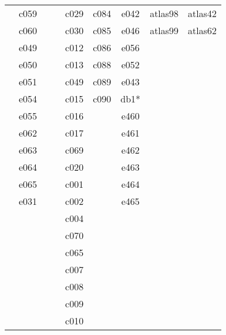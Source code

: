 \documentclass[10pt,letterpaper]{article}
\begin{document}
\begin{center}
\begin{tabular}{ |c|c|c|c|c|c|c|c|c| }
        & c059 &         &         & c029 & c084       & e042 & atlas98 & atlas42 \\
        & c060 &         &         & c030 & c085       & e046 & atlas99 & atlas62 \\
        & e049 &         &         & c012 & c086       & e056 &         &         \\
        & e050 &         &         & c013 & c088       & e052 &         &         \\
        & e051 &         &         & c049 & c089       & e043 &         &         \\
        & e054 &         &         & c015 & c090       & db1* &         &         \\
        & e055 &         &         & c016 &            & e460 &         &         \\
        & e062 &         &         & c017 &            & e461 &         &         \\
        & e063 &         &         & c069 &            & e462 &         &         \\
        & e064 &         &         & c020 &            & e463 &         &         \\
        & e065 &         &         & c001 &            & e464 &         &         \\
        & e031 &         &         & c002 &            & e465 &         &         \\
        &      &         &         & c004 &            &      &         &         \\
        &      &         &         & c070 &            &      &         &         \\
        &      &         &         & c065 &            &      &         &         \\
        &      &         &         & c007 &            &      &         &         \\
        &      &         &         & c008 &            &      &         &         \\
        &      &         &         & c009 &            &      &         &         \\
        &      &         &         & c010 &            &      &         &         \\


        \hline
        \end{tabular}
        \end{center}
\end{document}
